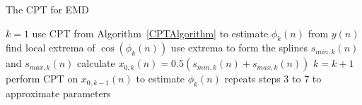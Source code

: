 \documentclass[a4paper]{IEEEtran}
\begin{document}
\begin{algorithm}
\caption{The CPT for EMD}\label{CPTEMDAlgorithm}
\begin{algorithmic}[1]
\State $k=1$
\State use CPT from Algorithm~\ref{CPTAlgorithm} to estimate $\phi_k(n)$ from $y(n)$
\State find local extrema of $\cos\left(\phi_k(n)\right)$
\State use extrema to form the splines $s_{min,k}(n)$ and $s_{max,k}(n)$
\State calculate $x_{0,k}(n) = 0.5\left(s_{min,k}(n) + s_{max,k}(n)\right)$
    \State $k=k+1$
    \State perform CPT on $x_{0,k-1}(n)$ to estimate $\phi_{k}(n)$
    \State repeats steps 3 to 7 to approximate parameters
\EndWhile
\end{algorithmic}
\end{algorithm}

\end{document}
